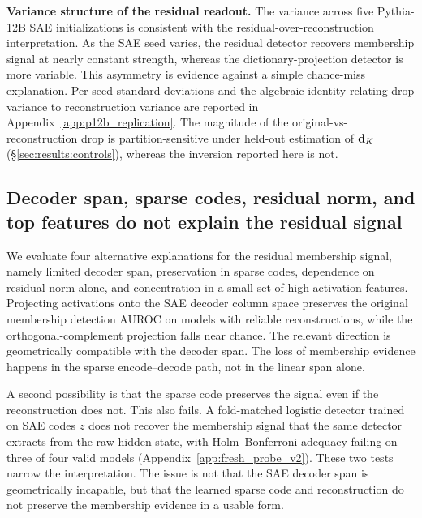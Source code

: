 \textbf{Variance structure of the residual readout.}
The variance across five Pythia-12B SAE initializations is consistent with the residual-over-reconstruction interpretation. As the SAE seed varies, the residual detector recovers membership signal at nearly constant strength, whereas the dictionary-projection detector is more variable. This asymmetry is evidence against a simple chance-miss explanation. Per-seed standard deviations and the algebraic identity relating drop variance to reconstruction variance are reported in Appendix~\ref{app:p12b_replication}. The magnitude of the original-vs-reconstruction drop is partition-sensitive under held-out estimation of $\mathbf{d}_K$ (\S\ref{sec:results:controls}), whereas the inversion reported here is not.

\subsection{Decoder span, sparse codes, residual norm, and top features do not explain the residual signal}
\label{sec:results:adequacy}

We evaluate four alternative explanations for the residual membership signal, namely limited decoder span, preservation in sparse codes, dependence on residual norm alone, and concentration in a small set of high-activation features. Projecting activations onto the SAE decoder column space preserves the original membership detection AUROC on models with reliable reconstructions, while the orthogonal-complement projection falls near chance. The relevant direction is geometrically compatible with the decoder span. The loss of membership evidence happens in the sparse encode--decode path, not in the linear span alone.

A second possibility is that the sparse code preserves the signal even if the reconstruction does not. This also fails. A fold-matched logistic detector
trained on SAE codes $z$ does not recover the membership signal that the same detector extracts from the raw hidden state, with Holm--Bonferroni adequacy
failing on three of four valid models (Appendix~\ref{app:fresh_probe_v2}). These two tests narrow the interpretation. The issue is not that the SAE
decoder span is geometrically incapable, but that the learned sparse code and reconstruction do not preserve the membership evidence in a usable form.

